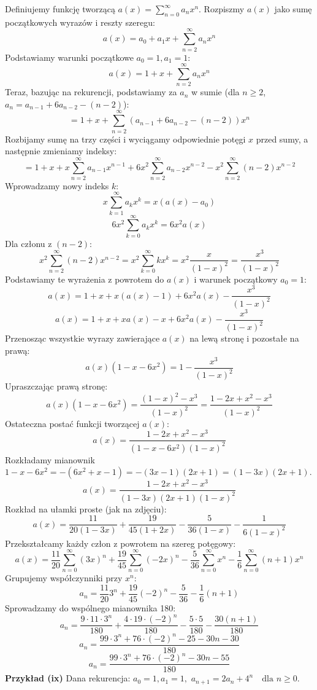 \documentclass{mwart}
\begin{document}
\begin{mdframed}
    Definiujemy funkcję tworzącą $a(x) = \sum_{n=0}^{\infty} a_n x^n$.
    Rozpiszmy $a(x)$ jako sumę początkowych wyrazów i reszty szeregu:
    $$ a(x) = a_0 + a_1 x + \sum_{n=2}^{\infty} a_n x^n $$
    Podstawiamy warunki początkowe $a_0 = 1, a_1 = 1$:
    $$ a(x) = 1 + x + \sum_{n=2}^{\infty} a_n x^n $$
    Teraz, bazując na rekurencji, podstawiamy za $a_n$ w sumie (dla $n \ge 2$, $a_n = a_{n-1} + 6a_{n-2} - (n-2)$):
    $$ = 1 + x + \sum_{n=2}^{\infty} (a_{n-1} + 6a_{n-2} - (n-2)) x^n $$
    Rozbijamy sumę na trzy części i wyciągamy odpowiednie potęgi $x$ przed sumy, a następnie zmieniamy indeksy:
    $$ = 1 + x + x \sum_{n=2}^{\infty} a_{n-1} x^{n-1} + 6x^2 \sum_{n=2}^{\infty} a_{n-2} x^{n-2} - x^2 \sum_{n=2}^{\infty} (n-2) x^{n-2} $$
    Wprowadzamy nowy indeks $k$:
    $$ x \sum_{k=1}^{\infty} a_k x^k = x(a(x) - a_0) $$
    $$ 6x^2 \sum_{k=0}^{\infty} a_k x^k = 6x^2 a(x) $$
    Dla członu z $(n-2)$:
    $$ x^2 \sum_{n=2}^{\infty} (n-2) x^{n-2} = x^2 \sum_{k=0}^{\infty} k x^k = x^2 \frac{x}{(1-x)^2} = \frac{x^3}{(1-x)^2} $$
    Podstawiamy te wyrażenia z powrotem do $a(x)$ i warunek początkowy $a_0=1$:
    $$ a(x) = 1 + x + x(a(x) - 1) + 6x^2 a(x) - \frac{x^3}{(1-x)^2} $$
    $$ a(x) = 1 + x + x a(x) - x + 6x^2 a(x) - \frac{x^3}{(1-x)^2} $$
    Przenosząc wszystkie wyrazy zawierające $a(x)$ na lewą stronę i pozostałe na prawą:
    $$ a(x) (1 - x - 6x^2) = 1 - \frac{x^3}{(1-x)^2} $$
    Upraszczając prawą stronę:
    $$ a(x) (1 - x - 6x^2) = \frac{(1-x)^2 - x^3}{(1-x)^2} = \frac{1 - 2x + x^2 - x^3}{(1-x)^2} $$
    Ostateczna postać funkcji tworzącej $a(x)$:
    $$ a(x) = \frac{1 - 2x + x^2 - x^3}{(1 - x - 6x^2)(1-x)^2} $$
    Rozkładamy mianownik $1 - x - 6x^2 = -(6x^2+x-1) = -(3x-1)(2x+1) = (1-3x)(2x+1)$.
    $$ a(x) = \frac{1 - 2x + x^2 - x^3}{(1-3x)(2x+1)(1-x)^2} $$
    Rozkład na ułamki proste (jak na zdjęciu):
    $$ a(x) = \frac{11}{20(1-3x)} + \frac{19}{45(1+2x)} - \frac{5}{36(1-x)} - \frac{1}{6(1-x)^2} $$
    Przekształcamy każdy człon z powrotem na szereg potęgowy:
    $$ a(x) = \frac{11}{20} \sum_{n=0}^{\infty} (3x)^n + \frac{19}{45} \sum_{n=0}^{\infty} (-2x)^n - \frac{5}{36} \sum_{n=0}^{\infty} x^n - \frac{1}{6} \sum_{n=0}^{\infty} (n+1)x^n $$
    Grupujemy współczynniki przy $x^n$:
    $$ a_n = \frac{11}{20} 3^n + \frac{19}{45} (-2)^n - \frac{5}{36} - \frac{1}{6}(n+1) $$
    Sprowadzamy do wspólnego mianownika 180:
    $$ a_n = \frac{9 \cdot 11 \cdot 3^n}{180} + \frac{4 \cdot 19 \cdot (-2)^n}{180} - \frac{5 \cdot 5}{180} - \frac{30(n+1)}{180} $$
    $$ a_n = \frac{99 \cdot 3^n + 76 \cdot (-2)^n - 25 - 30n - 30}{180} $$
    $$ a_n = \frac{99 \cdot 3^n + 76 \cdot (-2)^n - 30n - 55}{180} $$
    \textbf{Przykład (ix)}\newline
    Dana rekurencja:
    $a_0 = 1, a_1 = 1,$
    $a_{n+1} = 2a_n + 4^n \quad \text{dla } n \ge 0.$


\end{mdframed}
\end{document}
